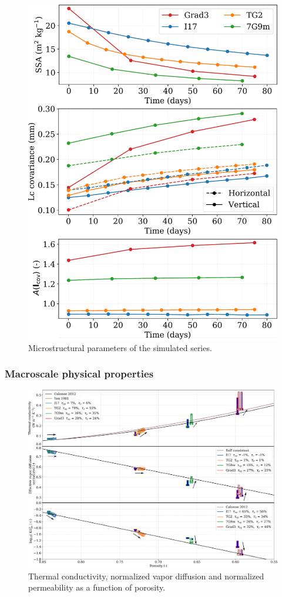 \documentclass[draft,ms]{agujournal2019}
\begin{document}
\begin{figure}
    \centering
    \includegraphics[width=0.6\linewidth]{Figures/4_images_microstructure.pdf}
    \caption{Microstructural parameters of the simulated series.}
    \label{fig:4_images_microstruct}
\end{figure}


\subsubsection{Macroscale physical properties}

\begin{figure}
    \centering
    \includegraphics[width=\linewidth]{Figures/Tplot_tau.pdf}
    \caption{Thermal conductivity, normalized vapor diffusion and normalized permeability as a function of porosity.}
    \label{fig:Tplot}
\end{figure}
\end{document}
